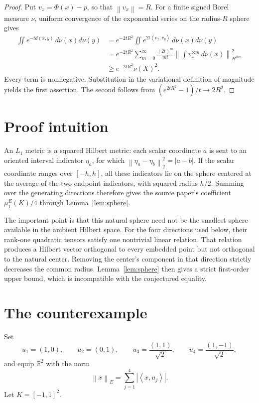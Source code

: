 \documentclass[11pt]{article}
\newcommand{\R}{\mathbb R}
\newcommand{\ip}[2]{\left\langle #1,#2\right\rangle}
\newcommand{\norm}[1]{\left\lVert #1\right\rVert}
\begin{document}
\begin{proof}
Put \(v_x=\Phi(x)-p\), so that \(\norm{v_x}=R\). For a finite signed
Borel measure \(\nu\), uniform convergence of the exponential series on the
radius-\(R\) sphere gives
\begin{align*}
 \iint e^{-t d(x,y)}\,d\nu(x)d\nu(y)
 &=e^{-2tR^2}\iint e^{2t\ip{v_x}{v_y}}\,d\nu(x)d\nu(y)\\
 &=e^{-2tR^2}\sum_{m=0}^{\infty}\frac{(2t)^m}{m!}
   \norm{\int v_x^{\otimes m}\,d\nu(x)}_{H^{\otimes m}}^2\\
 &\ge e^{-2tR^2}\nu(X)^2.
\end{align*}
Every term is nonnegative. Substitution in the variational definition of
magnitude yields the first assertion. The second follows from
\((e^{2tR^2}-1)/t\to2R^2\).
\end{proof}

\section{Proof intuition}

An \(L_1\) metric is a squared Hilbert metric: each scalar coordinate
\(a\) is sent to an oriented interval indicator \(\eta_a\), for which
\(\norm{\eta_a-\eta_b}_2^2=|a-b|\).  If the scalar coordinate ranges over
\([-h,h]\), all these indicators lie on the sphere centered at the average
of the two endpoint indicators, with squared radius \(h/2\).  Summing over
the generating directions therefore gives the source paper's coefficient
\(\mu_1^E(K)/4\) through Lemma~\ref{lem:sphere}.

The important point is that this natural sphere need not be the smallest
sphere available in the ambient Hilbert space.  For the four directions
used below, their rank-one quadratic tensors satisfy one nontrivial linear
relation.  That relation produces a Hilbert vector orthogonal to every
embedded point but not orthogonal to the natural center.  Removing the
center's component in that direction strictly decreases the common radius.
Lemma~\ref{lem:sphere} then gives a strict first-order upper bound, which is
incompatible with the conjectured equality.

\section{The counterexample}

Set
\[
 u_1=(1,0),\qquad u_2=(0,1),\qquad
 u_3=\frac{(1,1)}{\sqrt2},\qquad
 u_4=\frac{(1,-1)}{\sqrt2},
\]
and equip \(\R^2\) with the norm
\begin{equation}\label{eq:norm}
 \norm{x}_E=\sum_{j=1}^4|\ip{x}{u_j}|.
\end{equation}
Let \(K=[-1,1]^2\).
\end{document}
